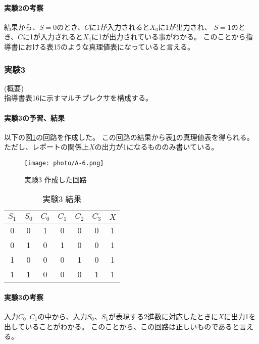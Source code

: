 \documentclass[dvipdfmx]{jsarticle}
\begin{document}
\paragraph*{実験2の考察}
結果から、$S=0$のとき、$C$に1が入力されると$X_0$に1が出力され、
$S=1$のとき、$C$に1が入力されると$X_1$に1が出力されている事がわかる。
このことから指導書\cite{degital}における表15のような真理値表になっていると言える。

\subsubsection{実験3}
(概要)\\
指導書\cite[p.3-11]{degital}表16に示すマルチプレクサを構成する。

\paragraph*{実験3の予習、結果}
以下の図\ref*{fig:A-6}の回路を作成した。
この回路の結果から表\ref*{tb:A-9}の真理値表を得られる。
ただし、レポートの関係上$X$の出力が1になるもののみ書いている。
\begin{figure}[hbtp]
  \begin{center}
    \texttt{[image: photo/A-6.png]}
  \end{center}
  \caption{実験3 作成した回路}
  \label{fig:A-6}
\end{figure}

\begin{table}[hbtp]
  \centering
  \caption{実験3 結果}
  \begin{tabular}{|c|c|c|c|c|c||c|} \hline
    $S_1$ & $S_0$ & $C_0$ & $C_1$ & $C_2$ & $C_3$ & $X$ \\ \hline\hline
    0 & 0 & 1 & 0 & 0 & 0 & 1 \\ \hline
    0 & 1 & 0 & 1 & 0 & 0 & 1\\ \hline
    1 & 0 & 0 & 0 & 1 & 0 & 1\\ \hline
    1 & 1 & 0 & 0 & 0 & 1 & 1\\ \hline
  \end{tabular}
  \label{tb:A-9}
\end{table}
\paragraph*{実験3の考察}

入力$C_0$~$C_1$の中から、入力$S_0$、$S_1$が表現する2進数に対応したときに$X$に出力1を出していることがわかる。
このことから、この回路は正しいものであると言える。
\end{document}
